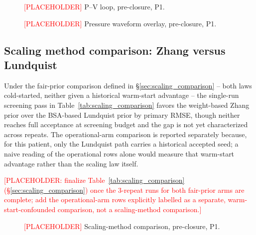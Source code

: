 \documentclass{article}
\begin{document}
\begin{figure}[h]
    \centering
    \caption{\textcolor{red}{[PLACEHOLDER]} P--V loop, pre-closure, P1.}
    \label{fig:pv_loop_pre}
\end{figure}

\begin{figure}[h]
    \centering
    \caption{\textcolor{red}{[PLACEHOLDER]} Pressure waveform overlay, pre-closure, P1.}
    \label{fig:waveform_pre}
\end{figure}

\subsection{Scaling method comparison: Zhang versus Lundquist}
\label{sec:results_scaling}

Under the fair-prior comparison defined in \S\ref{sec:scaling_comparison} -- both laws cold-started, neither given a historical warm-start advantage -- the single-run screening pass in Table~\ref{tab:scaling_comparison} favors the weight-based Zhang prior over the BSA-based Lundquist prior by primary RMSE, though neither reaches full acceptance at screening budget and the gap is not yet characterized across repeats. The operational-arm comparison is reported separately because, for this patient, only the Lundquist path carries a historical accepted seed; a naive reading of the operational rows alone would measure that warm-start advantage rather than the scaling law itself.

\textcolor{red}{[PLACEHOLDER: finalize Table~\ref{tab:scaling_comparison} (\S\ref{sec:scaling_comparison}) once the 3-repeat runs for both fair-prior arms are complete; add the operational-arm rows explicitly labelled as a separate, warm-start-confounded comparison, not a scaling-method comparison.]}

\begin{figure}[h]
    \centering
    \caption{\textcolor{red}{[PLACEHOLDER]} Scaling-method comparison, pre-closure, P1.}
    \label{fig:scaling_comparison}
\end{figure}
\end{document}
